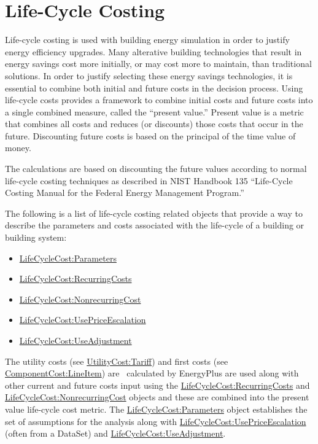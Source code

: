 \section{Life-Cycle Costing}\label{life-cycle-costing}

Life-cycle costing is used with building energy simulation in order to justify energy efficiency upgrades. Many alterative building technologies that result in energy savings cost more initially, or may cost more to maintain, than traditional solutions. In order to justify selecting these energy savings technologies, it is essential to combine both initial and future costs in the decision process. Using life-cycle costs provides a framework to combine initial costs and future costs into a single combined measure, called the ``present value.'' Present value is a metric that combines all costs and reduces (or discounts) those costs that occur in the future. Discounting future costs is based on the principal of the time value of money.

The calculations are based on discounting the future values according to normal life-cycle costing techniques as described in NIST Handbook 135 ``Life-Cycle Costing Manual for the Federal Energy Management Program.''

The following is a list of life-cycle costing related objects that provide a way to describe the parameters and costs associated with the life-cycle of a building or building system:

\begin{itemize}
\item
  \hyperref[lifecyclecostparameters]{LifeCycleCost:Parameters}
\item
  \hyperref[lifecyclecostrecurringcosts]{LifeCycleCost:RecurringCosts}
\item
  \hyperref[lifecyclecostnonrecurringcost]{LifeCycleCost:NonrecurringCost}
\item
  \hyperref[lifecyclecostusepriceescalation]{LifeCycleCost:UsePriceEscalation}
\item
  \hyperref[lifecyclecostuseadjustment]{LifeCycleCost:UseAdjustment}
\end{itemize}

The utility costs (see \hyperref[utilitycosttariff]{UtilityCost:Tariff}) and first costs (see \hyperref[componentcostlineitem]{ComponentCost:LineItem}) are~ calculated by EnergyPlus are used along with other current and future costs input using the \hyperref[lifecyclecostrecurringcosts]{LifeCycleCost:RecurringCosts} and \hyperref[lifecyclecostnonrecurringcost]{LifeCycleCost:NonrecurringCost} objects and these are combined into the present value life-cycle cost metric. The \hyperref[lifecyclecostparameters]{LifeCycleCost:Parameters} object establishes the set of assumptions for the analysis along with \hyperref[lifecyclecostusepriceescalation]{LifeCycleCost:UsePriceEscalation} (often from a DataSet) and \hyperref[lifecyclecostuseadjustment]{LifeCycleCost:UseAdjustment}.

